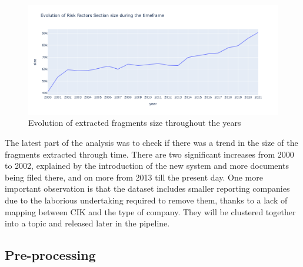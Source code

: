 \documentclass[12pt,MSc,a4paper,oneside]{muthesis}
\begin{document}
\begin{figure}[h]
    \centering
    \includegraphics[scale=0.5]{dataset_analysis/Evolution of size .png}
    \caption{Evolution of extracted fragments size throughout the years}
\end{figure}

The latest part of the analysis was to check if there was a trend in the size of the fragments extracted through time. There are two significant increases from 2000 to 2002, explained by the introduction of the new system and more documents being filed there, and on more from 2013 till the present day. One more important observation is that the dataset includes smaller reporting companies due to the laborious undertaking required to remove them, thanks to a lack of mapping between CIK and the type of company. They will be clustered together into a topic and released later in the pipeline.

\subsection{Pre-processing}
\end{document}
